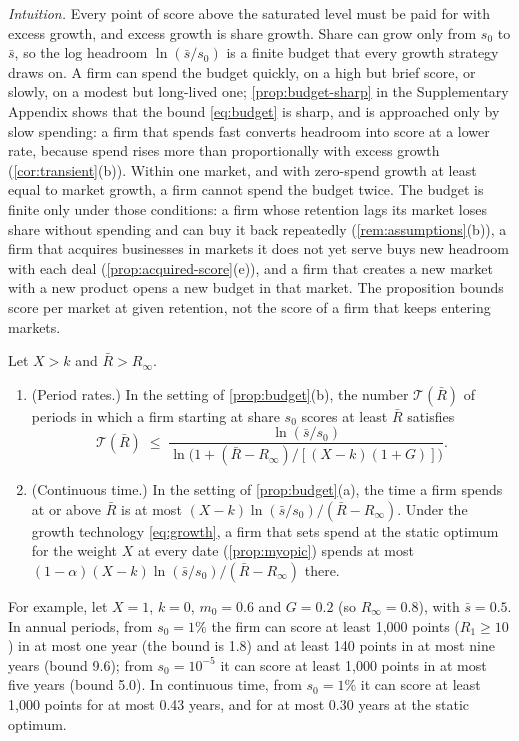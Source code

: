 \noindent\emph{Intuition.} Every point of score above the saturated level must be paid for with excess growth, and excess growth is share growth. Share can grow only from $s_0$ to $\bar s$, so the log headroom $\ln(\bar s/s_0)$ is a finite budget that every growth strategy draws on. A firm can spend the budget quickly, on a high but brief score, or slowly, on a modest but long-lived one; \autoref{prop:budget-sharp} in the Supplementary Appendix shows that the bound \eqref{eq:budget} is sharp, and is approached only by slow spending: a firm that spends fast converts headroom into score at a lower rate, because spend rises more than proportionally with excess growth (\autoref{cor:transient}(b)). Within one market, and with zero-spend growth at least equal to market growth, a firm cannot spend the budget twice. The budget is finite only under those conditions: a firm whose retention lags its market loses share without spending and can buy it back repeatedly (\autoref{rem:assumptions}(b)), a firm that acquires businesses in markets it does not yet serve buys new headroom with each deal (\autoref{prop:acquired-score}(e)), and a firm that creates a new market with a new product opens a new budget in that market. The proposition bounds score per market at given retention, not the score of a firm that keeps entering markets.

\begin{corollary}\label{cor:transient}
Let $X>k$ and $\bar R>R_\infty$.
\begin{enumerate}
\item[(a)] (Period rates.) In the setting of \autoref{prop:budget}(b), the number $\mathcal T(\bar R)$ of periods in which a firm starting at share $s_0$ scores at least $\bar R$ satisfies
\begin{equation}\label{eq:transient}
\mathcal T(\bar R)\;\le\;\frac{\ln(\bar s/s_0)}{\ln\bigl(1+(\bar R-R_\infty)/[(X-k)(1+G)]\bigr)} .
\end{equation}
\item[(b)] (Continuous time.) In the setting of \autoref{prop:budget}(a), the time a firm spends at or above $\bar R$ is at most $(X-k)\ln(\bar s/s_0)/(\bar R-R_\infty)$. Under the growth technology \eqref{eq:growth}, a firm that sets spend at the static optimum for the weight $X$ at every date (\autoref{prop:myopic}) spends at most $(1-\alpha)(X-k)\ln(\bar s/s_0)/(\bar R-R_\infty)$ there.
\end{enumerate}
For example, let $X=1$, $k=0$, $m_0=0.6$ and $G=0.2$ (so $R_\infty=0.8$), with $\bar s=0.5$. In annual periods, from $s_0=1\%$ the firm can score at least 1{,}000 points ($R_1\ge 10$) in at most one year (the bound is 1.8) and at least 140 points in at most nine years (bound 9.6); from $s_0=10^{-5}$ it can score at least 1{,}000 points in at most five years (bound 5.0). In continuous time, from $s_0=1\%$ it can score at least 1{,}000 points for at most 0.43 years, and for at most 0.30 years at the static optimum.
\end{corollary}

